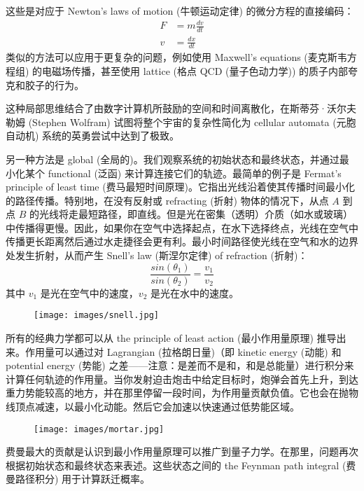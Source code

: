 这些是对应于 Newton's laws of motion (牛顿运动定律) 的微分方程的直接编码：
\begin{align*}
  F & = m \frac{dv}{dt} \\
  v & = \frac{dx}{dt}
\end{align*}
类似的方法可以应用于更复杂的问题，例如使用 Maxwell's equations (麦克斯韦方程组) 的电磁场传播，甚至使用 lattice  (格点 QCD (量子色动力学)) 的质子内部夸克和胶子的行为。

这种局部思维结合了由数字计算机所鼓励的空间和时间离散化，在斯蒂芬·沃尔夫勒姆 (Stephen Wolfram) 试图将整个宇宙的复杂性简化为 cellular automata (元胞自动机) 系统的英勇尝试中达到了极致。

另一种方法是 global (全局的)。我们观察系统的初始状态和最终状态，并通过最小化某个 functional (泛函) 来计算连接它们的轨迹。最简单的例子是 Fermat's principle of least time (费马最短时间原理)。它指出光线沿着使其传播时间最小化的路径传播。特别地，在没有反射或 refracting (折射) 物体的情况下，从点 $A$ 到点 $B$ 的光线将走最短路径，即直线。但是光在密集（透明）介质（如水或玻璃）中传播得更慢。因此，如果你在空气中选择起点，在水下选择终点，光线在空气中传播更长距离然后通过水走捷径会更有利。最小时间路径使光线在空气和水的边界处发生折射，从而产生 Snell's law (斯涅尔定律) of refraction (折射)：
\begin{equation*}
  \frac{sin(\theta_1)}{sin(\theta_2)} = \frac{v_1}{v_2}
\end{equation*}
其中 $v_1$ 是光在空气中的速度，$v_2$ 是光在水中的速度。

\begin{figure}[H]
  \centering
  \texttt{[image: images/snell.jpg]}
\end{figure}

\noindent
所有的经典力学都可以从 the principle of least action (最小作用量原理) 推导出来。作用量可以通过对 Lagrangian (拉格朗日量)（即 kinetic energy (动能) 和 potential energy (势能) 之差——注意：是差而不是和，和是总能量）进行积分来计算任何轨迹的作用量。当你发射迫击炮击中给定目标时，炮弹会首先上升，到达重力势能较高的地方，并在那里停留一段时间，为作用量贡献负值。它也会在抛物线顶点减速，以最小化动能。然后它会加速以快速通过低势能区域。

\begin{figure}[H]
  \centering
  \texttt{[image: images/mortar.jpg]}
\end{figure}

\noindent
费曼最大的贡献是认识到最小作用量原理可以推广到量子力学。在那里，问题再次根据初始状态和最终状态来表述。这些状态之间的 the Feynman path integral (费曼路径积分) 用于计算跃迁概率。

